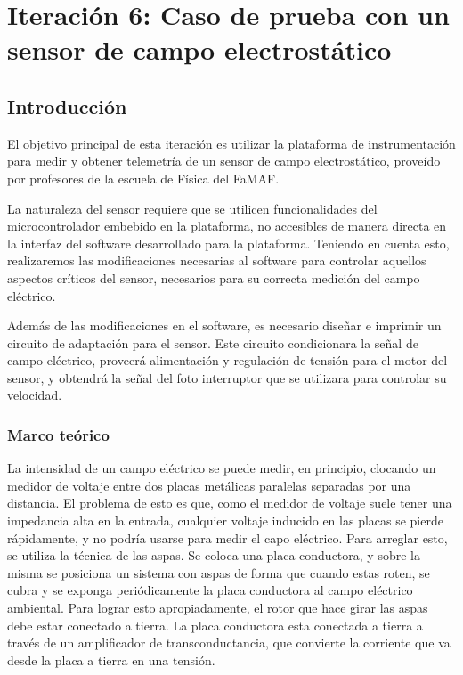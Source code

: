 \chapter{Iteración 6: Caso de prueba con un sensor de campo electrostático} %
\label{cha:iteracion_6}

\section{Introducción} %
\label{it6:sec:introduccion}

El objetivo principal de esta iteración es utilizar la plataforma de instrumentación para medir y obtener telemetría de un sensor de campo electrostático, proveído por profesores de la escuela de Física del FaMAF.

La naturaleza del sensor requiere que se utilicen funcionalidades del microcontrolador embebido en la plataforma, no accesibles de manera directa en la interfaz del software desarrollado para la plataforma. Teniendo en cuenta esto, realizaremos las modificaciones necesarias al software para controlar aquellos aspectos críticos del sensor, necesarios para su correcta medición del campo eléctrico.

Además de las modificaciones en el software, es necesario diseñar e imprimir un circuito de adaptación para el sensor. Este circuito condicionara la señal de campo eléctrico, proveerá alimentación y regulación de tensión para el motor del sensor, y obtendrá la señal del foto interruptor que se utilizara para controlar su velocidad.



\subsection{Marco teórico} %
\label{it6:sub:marco_teorico}

La intensidad de un campo eléctrico se puede medir, en principio, clocando un medidor de voltaje entre dos placas metálicas paralelas separadas por una distancia. El problema de esto es que, como el medidor de voltaje suele tener una impedancia alta en la entrada, cualquier voltaje inducido en las placas se pierde rápidamente, y no podría usarse para medir el capo eléctrico. Para arreglar esto, se utiliza la técnica de las aspas. Se coloca una placa conductora, y sobre la misma se posiciona un sistema con aspas de forma que cuando estas roten, se cubra y se exponga periódicamente la placa conductora al campo eléctrico ambiental. Para lograr esto apropiadamente, el rotor que hace girar las aspas debe estar conectado a tierra. La placa conductora esta conectada a tierra a través de un amplificador de transconductancia, que convierte la corriente que va desde la placa a tierra en una tensión. \\

